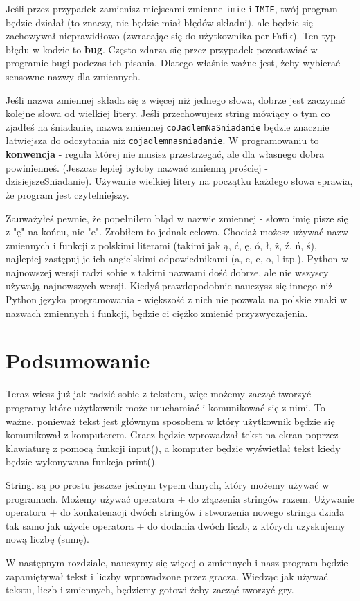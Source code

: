 \documentclass{book}
\begin{document}
Jeśli przez przypadek zamienisz miejscami zmienne \lstinline{imie} i \lstinline{IMIE}, twój program będzie działał (to znaczy, nie będzie miał błędów składni), ale będzie się zachowywał nieprawidłowo (zwracając się do użytkownika per Fafik). Ten typ błędu w kodzie to {\bf bug}. Często zdarza się przez przypadek pozostawiać w programie bugi podczas ich pisania. Dlatego właśnie ważne jest, żeby wybierać sensowne nazwy dla zmiennych.

Jeśli nazwa zmiennej składa się z więcej niż jednego słowa, dobrze jest zaczynać kolejne słowa od wielkiej litery. Jeśli przechowujesz string mówiący o tym co zjadłeś na śniadanie, nazwa zmiennej \lstinline{coJadlemNaSniadanie} będzie znacznie łatwiejsza do odczytania niż \lstinline{cojadlemnasniadanie}. W programowaniu to {\bf konwencja} - reguła której nie musisz przestrzegać, ale dla własnego dobra powinienneś. (Jeszcze lepiej byłoby nazwać zmienną prościej - dzisiejszeSniadanie). Używanie wielkiej litery na początku każdego słowa sprawia, że program jest czytelniejszy.

Zauważyłeś pewnie, że popełniłem błąd w nazwie zmiennej - słowo imię pisze się z "ę" na końcu, nie "e". Zrobiłem to jednak celowo. Chociaż możesz używać nazw zmiennych i funkcji z polskimi literami (takimi jak ą, ć, ę, ó, ł, ż, ź, ń, ś), najlepiej zastępuj je ich angielskimi odpowiednikami (a, c, e, o, l itp.). Python w najnowszej wersji radzi sobie z takimi nazwami dość dobrze, ale nie wszyscy używają najnowszych wersji. Kiedyś prawdopodobnie nauczysz się innego niż Python języka programowania - większość z nich nie pozwala na polskie znaki w nazwach zmiennych i funkcji, będzie ci ciężko zmienić przyzwyczajenia.

\section{Podsumowanie}

Teraz wiesz już jak radzić sobie z tekstem, więc możemy zacząć tworzyć programy które użytkownik może uruchamiać i komunikować się z nimi. To ważne, ponieważ tekst jest głównym sposobem w który użytkownik będzie się komunikował z komputerem. Gracz będzie wprowadzał tekst na ekran poprzez klawiaturę z pomocą funkcji input(), a komputer będzie wyświetlał tekst kiedy będzie wykonywana funkcja print().

Stringi są po prostu jeszcze jednym typem danych, który możemy używać w programach. Możemy używać operatora + do złączenia stringów razem. Używanie operatora + do konkatenacji dwóch stringów i stworzenia nowego stringa działa tak samo jak użycie operatora + do dodania dwóch liczb, z których uzyskujemy nową liczbę (sumę).

W następnym rozdziale, nauczymy się więcej o zmiennych i nasz program będzie zapamiętywał tekst i liczby wprowadzone przez gracza. Wiedząc jak używać tekstu, liczb i zmiennych, będziemy gotowi żeby zacząć tworzyć gry.
\end{document}
